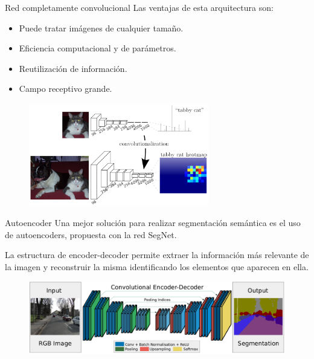 \begin{frame}{Red completamente convolucional}
Las ventajas de esta arquitectura son:
\begin{itemize}
    \item Puede tratar \alert{imágenes de cualquier tamaño}.
    \item \alert{Eficiencia computacional} y de \alert{parámetros}.
    \item Reutilización de \alert{información}.
    \item Campo receptivo \alert{grande}.
\end{itemize}

\begin{figure}
    \centering
    \includegraphics[width=0.7\textwidth]{Slides/figures/Tema 4/FullyCNNPaper.png}
    \caption{\cite{long2015fully}}
\end{figure}
\end{frame}

\begin{frame}{Autoencoder}
Una \alert{mejor solución} para realizar segmentación semántica es el uso de \alert{autoencoders}, propuesta con la red \alert{SegNet}\cite{badrinarayanan2015segnet}.

La estructura de \alert{encoder-decoder} permite extraer la información más relevante de la imagen y \alert{reconstruir} la misma \alert{identificando los elementos} que aparecen en ella.

\begin{figure}
    \centering
    \includegraphics[width=\textwidth]{Slides/figures/Tema 4/SegNet.png}
    \caption{\cite{badrinarayanan2015segnet}}
\end{figure}
\end{frame}

